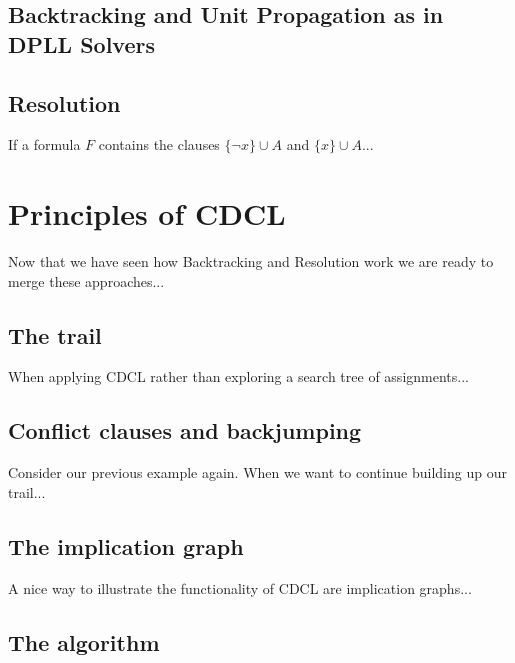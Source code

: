 \subsection{Backtracking and Unit Propagation as in DPLL Solvers}


\subsection{Resolution}

If a formula \(F\) contains the clauses \(\{\neg x\} \cup A\) and \(\{x\} \cup A\)...

\newpage
\section{Principles of CDCL}

Now that we have seen how Backtracking and Resolution work we are ready to merge these approaches...

\subsection{The trail}

When applying CDCL rather than exploring a search tree of assignments...

\subsection{Conflict clauses and backjumping}

Consider our previous example again. When we want to continue building up our trail...

\subsection{The implication graph}

A nice way to illustrate the functionality of CDCL are implication graphs...

\subsection{The algorithm}

